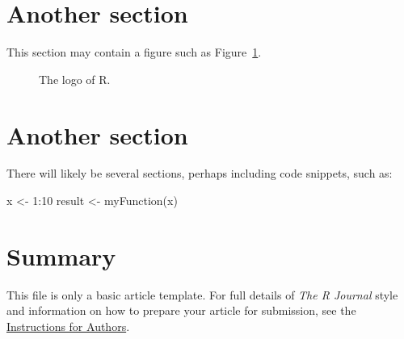 \section{Another section}

This section may contain a figure such as Figure~\ref{figure:rlogo}.

\begin{figure}[htbp]
  \centering
  \caption{The logo of R.}
  \label{figure:rlogo}
\end{figure}

\section{Another section}

There will likely be several sections, perhaps including code snippets, such as:

\begin{example}
  x <- 1:10
  result <- myFunction(x)
\end{example}

\section{Summary}

This file is only a basic article template. For full details of \emph{The R Journal} style and information on how to prepare your article for submission, see the \href{https://journal.r-project.org/share/author-guide.pdf}{Instructions for Authors}.



\address{Author One\\
  Affiliation\\
  Address\\
  Country\\
  (ORCiD if desired)\\
  }

\address{Author Two\\
  Affiliation\\
  Address\\
  Country\\
  (ORCiD if desired)\\
  }

\address{Author Three\\
  Affiliation\\
  Address\\
  Country\\
  (ORCiD if desired)\\
  }
